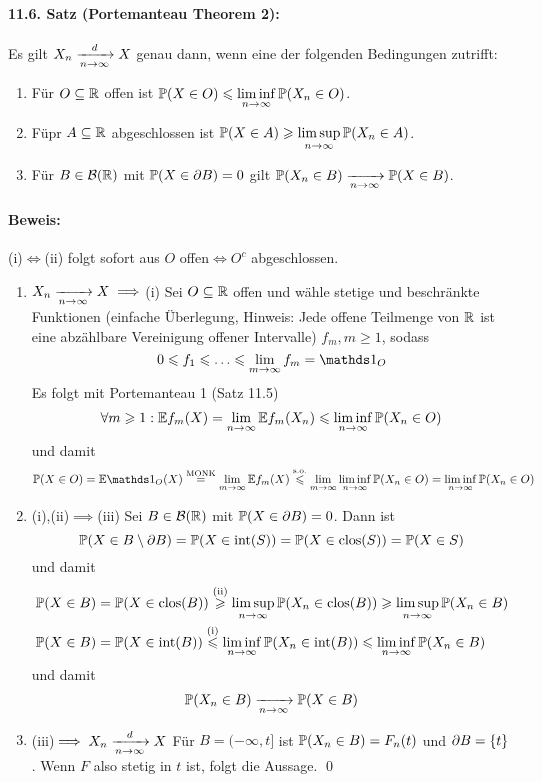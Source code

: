 \paragraph{11.6. Satz (Portemanteau Theorem 2):} Es gilt $X_n\nto{d}{n\to\infty}X$ genau dann, wenn eine der folgenden Bedingungen zutrifft:
\begin{enumerate}[label=(\roman*)]
    \item F\"ur $O\subseteq\mathbb{R}$ offen ist $\mathbb{P}(X\in O)\leqslant\displaystyle\liminf_{n\to\infty}\mathbb{P}(X_n\in O)$.
    \item F\"upr $A\subseteq\mathbb{R}$ abgeschlossen ist $\mathbb{P}(X\in A)\geqslant\displaystyle\limsup_{n\to\infty}\mathbb{P}(X_n\in A)$.
    \item F\"ur $B\in\mathcal{B}(\mathbb{R})$ mit $\mathbb{P}(X\in\partial B)=0$ gilt $\Pp(X_n\in B)\nto{}{n\to\infty}\Pp(X\in B)$.
\end{enumerate}

\paragraph{Beweis:} (i)$\iff$(ii) folgt sofort aus $O$ offen$\iff O^c$ abgeschlossen.
\begin{enumerate}[label=\Roman*.]
    \item $X_n\nto{}{n\to\infty}X\implies$(i)\newline
    Sei $O\subseteq\mathbb{R}$ offen und w\"ahle stetige und beschr\"ankte Funktionen (einfache \"Uberlegung, Hinweis: Jede offene Teilmenge von $\mathbb{R}$ ist eine abz\"ahlbare Vereinigung offener Intervalle) $f_m, m\geq 1$, sodass
    $$0\leq f_1\leq\hdots\leq\lim_{m\to\infty}f_m=\ind{O}$$
    Es folgt mit Portemanteau 1 (Satz 11.5)
    $$\forall m\geqslant1:\mathbb{E} f_m(X)=\lim_{n\to\infty}\mathbb{E} f_m(X_n)\leqslant\liminf_{n\to\infty}\mathbb{P}(X_n\in O)$$
    und damit
    $$\Pp(X\in O)=\E \ind{O}(X)\overset{\text{MONK}}{=}\lim_{m\to\infty}\E f_m(X)\overset{\text{s.o.}}{\leq}\lim_{m\to\infty}\liminf_{n\to\infty}\Pp(X_n\in O)=\liminf_{n\to\infty}\Pp(X_n\in O)$$
   \item (i),(ii)$\implies$(iii)\newline
   Sei $B\in\mathcal{B}(\mathbb{R})$ mit $\mathbb{P}(X\in\partial B)=0$. Dann ist
   $$\mathbb{P}(X\in B\setminus\partial B)=\mathbb{P}(X\in\text{int}(S))=\mathbb{P}(X\in\text{clos}(S))=\mathbb{P}(X\in S)$$
   und damit
   \begin{align*}
       &\mathbb{P}(X\in B)=\mathbb{P}(X\in\text{clos}(B))\overset{\text{(ii)}}{\geqslant}\limsup_{n\to\infty}\mathbb{P}(X_n\in\text{clos}(B))\geqslant\limsup_{n\to\infty}\mathbb{P}(X_n\in B) \\
       &\mathbb{P}(X\in B)=\mathbb{P}(X\in\text{int}(B))\overset{\text{(i)}}{\leqslant}\liminf_{n\to\infty}\mathbb{P}(X_n\in\text{int}(B))\leqslant\liminf_{n\to\infty}\mathbb{P}(X_n\in B) 
   \end{align*}
   und damit $$\Pp(X_n\in B)\nto{}{n\to\infty}\Pp(X\in B)$$
   \item (iii)$\implies X_n\nto{d}{n\to\infty}X$\newline
   F\"ur $B=(-\infty, t]$ ist $\mathbb{P}(X_n\in B)=F_n(t)$ und $\partial B=\{t\}$. Wenn $F$ also stetig in $t$ ist, folgt die Aussage. \qed
\end{enumerate}

